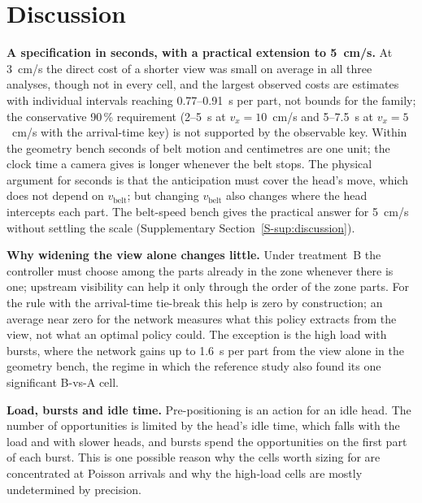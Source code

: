 \documentclass[11pt,a4paper]{article}
\newcommand{\vb}{v_{\mathrm{belt}}}
\newcommand{\supsec}[1]{Supplementary Section~\ref{S-#1}}
\begin{document}
\section{Discussion}\label{sec:discussion}

\textbf{A specification in seconds, with a practical extension to 5~cm/s.} At 3~cm/s the
direct cost of a shorter view was small on average in all three analyses, though not in
every cell, and the largest observed costs are estimates with individual intervals
reaching 0.77--0.91~s per part, not bounds for the family; the conservative 90\,\%
requirement (2--5~s at $v_x=10$~cm/s and 5--7.5~s at $v_x=5$~cm/s with the arrival-time
key) is not supported by the observable key. Within the geometry bench seconds of belt
motion and centimetres are one unit; the clock time a camera gives is longer whenever the
belt stops. The physical argument for seconds is that the anticipation must cover the
head's move, which does not depend on $\vb$; but changing $\vb$ also changes where the head
intercepts each part. The belt-speed bench gives the practical answer for 5~cm/s without
settling the scale (\supsec{sup:discussion}).

\textbf{Why widening the view alone changes little.} Under treatment~B the controller must
choose among the parts already in the zone whenever there is one; upstream visibility can
help it only through the order of the zone parts. For the rule with the arrival-time
tie-break this help is zero by construction; an average near zero for the network measures
what this policy extracts from the view, not what an optimal policy could. The exception is
the high load with bursts, where the network gains up to 1.6~s per part from the view alone
in the geometry bench, the regime in which the reference study also found its one
significant B-vs-A cell.

\textbf{Load, bursts and idle time.} Pre-positioning is an action for an idle head. The
number of opportunities is limited by the head's idle time, which falls with the load and
with slower heads, and bursts spend the opportunities on the first part of each burst. This is one
possible reason why the cells worth sizing for are concentrated at Poisson arrivals and why the
high-load cells are mostly undetermined by precision.
\end{document}
